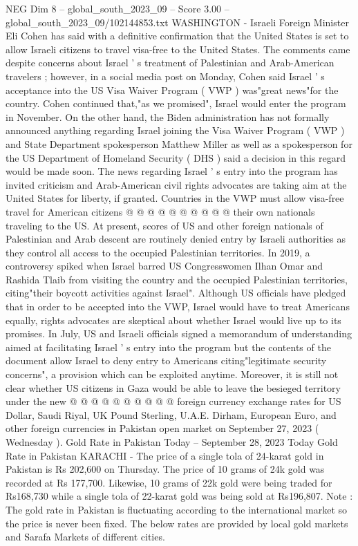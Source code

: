 \begin{textsample}{NEG Dim 8 – global\_south\_2023\_09 – Score 3.00 – global\_south\_2023\_09/102144853.txt}  \label{ex:f8_neg_327}
WASHINGTON - Israeli Foreign Minister Eli Cohen has said with a definitive confirmation that the United States is set to allow Israeli citizens to travel visa-free to the United States.
The comments came despite concerns about Israel ' s treatment of Palestinian and Arab-American travelers ; however, in a social media post on Monday, Cohen said Israel ' s acceptance into the US Visa Waiver Program ( VWP ) was"great news"for the country.
Cohen continued that,"as we promised", Israel would enter the program in November.
On the other hand, the Biden administration has not formally announced anything regarding Israel joining the Visa Waiver Program ( VWP ) and State Department spokesperson Matthew Miller as well as a spokesperson for the US Department of Homeland Security ( DHS ) said a decision in this regard would be made soon.
The news regarding Israel ' s entry into the program has invited criticism and Arab-American civil rights advocates are taking aim at the United States for liberty, if granted.
Countries in the VWP must allow visa-free travel for American citizens @ @ @ @ @ @ @ @ @ @ their own nationals traveling to the US.
At present, scores of US and other foreign nationals of Palestinian and Arab descent are routinely denied entry by Israeli authorities as they control all access to the occupied Palestinian territories.
In 2019, a controversy spiked when Israel barred US Congresswomen Ilhan Omar and Rashida Tlaib from visiting the country and the occupied Palestinian territories, citing"their boycott activities against Israel".
Although US officials have pledged that in order to be accepted into the VWP, Israel would have to treat Americans equally, rights advocates are skeptical about whether Israel would live up to its promises.
In July, US and Israeli officials signed a memorandum of understanding aimed at facilitating Israel ' s entry into the program but the contents of the document allow Israel to deny entry to Americans citing"legitimate security concerns", a provision which can be exploited anytime.
Moreover, it is still not clear whether US citizens in Gaza would be able to leave the besieged territory under the new @ @ @ @ @ @ @ @ @ @ foreign currency exchange rates for US Dollar, Saudi Riyal, UK Pound Sterling, U.A.E.
Dirham, European Euro, and other foreign currencies in Pakistan open market on September 27, 2023 ( Wednesday ).
Gold Rate in Pakistan Today -- September 28, 2023 Today Gold Rate in Pakistan KARACHI - The price of a single tola of 24-karat gold in Pakistan is Rs 202,600 on Thursday.
The price of 10 grams of 24k gold was recorded at Rs 177,700.
Likewise, 10 grams of 22k gold were being traded for Rs168,730 while a single tola of 22-karat gold was being sold at Rs196,807.
Note : The gold rate in Pakistan is fluctuating according to the international market so the price is never been fixed.
The below rates are provided by local gold markets and Sarafa Markets of different cities.

\end{textsample}
